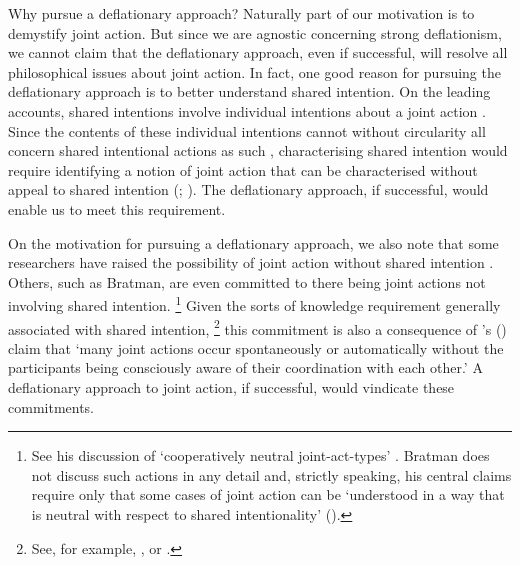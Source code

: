 \documentclass[12pt,a4paper]{extarticle}
\begin{document}
Why pursue a deflationary approach?
Naturally part of our motivation is to demystify joint action.
But since we are agnostic concerning strong deflationism, we cannot claim that the deflationary approach, even if successful, will resolve all philosophical issues about joint action.
In fact, one good reason for pursuing the deflationary approach is to better understand shared intention.
On the leading accounts, shared intentions involve individual intentions about a joint action \citep[e.g.][]{Bratman:1993je}.  
Since the contents of these individual intentions cannot without circularity all concern shared intentional actions as such \citep[p. 95]{Searle:1990em}, characterising shared intention would require identifying a notion of joint action that can be characterised without appeal to shared intention
 (\citealp{petersson_collectivity_2007}; \citealp[p. 163]{Bratman:2009lv}).  
The deflationary approach, if successful, would enable us to meet this requirement.

On the motivation for pursuing a deflationary approach,
we also note that some researchers have
raised the possibility of joint action without shared intention \citep[e.g.][]{vesper_minimal_2010}.
Others, such as Bratman, are even committed to there being joint actions not involving shared intention.%
%
\footnote{
See his discussion of `cooperatively neutral joint-act-types' \citep[p.\ 330]{Bratman:1992mi}.
Bratman does not discuss such actions in any detail and, strictly speaking, his central claims require only that some cases of joint action can be `understood in a way that is neutral with respect to shared intentionality' (\citeyear[p.\ 147]{Bratman:1999fr}).  
}
Given the sorts of knowledge requirement generally associated with shared intention,%
%
\footnote{
	See, for example, \citet{Bratman:1993je},
	\citet[p.\ 10]{Kutz:2000si} or 
	\citet[p. 56]{miller_social_2001}.
}
%
this commitment is also a consequence of 
	\citeauthor{schmidt_understanding_2010}'s 
	(\citeyear[p. 7]{schmidt_understanding_2010})
claim that `many joint actions occur spontaneously or automatically without the participants being consciously aware of their coordination with each other.'
A deflationary approach to joint action, if successful, would vindicate these commitments.
\end{document}
